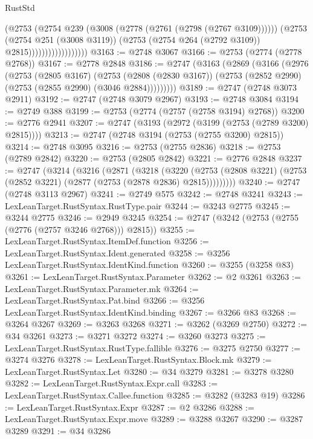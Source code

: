 \begin{lexlean}{RustStd}
\begin{coremodule}
{\begin{coremodule}
{{{{{{{{{{{{{{{{{{{{{{{{{{{{{{{{{                                  (@2753
                                    (@2754 @239 (@3008 (@2778 (@2761 (@2798 (@2767 @3109))))))
                                    (@2753
                                      (@2754 @251 (@3008 @3119))
                                      (@2753 (@2754 @264 (@2792 @3109)) @2815))))))))))))))))))
@3163 := @2748 @3067
@3166 := @2753 (@2774 (@2778 @2768))
@3167 := @2778 @2848
@3186 := @2747
    (@3163
      (@2869
        (@3166
          (@2976
            (@2753
              (@2805 @3167)
              (@2753
                (@2808 (@2830 @3167))
                (@2753 (@2852 @2990) (@2753 (@2855 @2990) (@3046 @2884)))))))))
@3189 := @2747 (@2748 @3073 @2911)
@3192 := @2747 (@2748 @3079 @2967)
@3193 := @2748 @3084
@3194 := @2749 @388
@3199 := @2753 (@2774 (@2757 (@2758 @3194) @2768))
@3200 := @2776 @2941
@3207 := @2747 (@3193 (@2972 (@3199 (@2753 (@2789 @3200) @2815))))
@3213 := @2747 (@2748 @3194 (@2753 (@2755 @3200) @2815))
@3214 := @2748 @3095
@3216 := @2753 (@2755 @2836)
@3218 := @2753 (@2789 @2842)
@3220 := @2753 (@2805 @2842)
@3221 := @2776 @2848
@3237 := @2747
    (@3214
      (@3216
        (@2871
          (@3218
            (@3220
              (@2753 (@2808 @3221) (@2753 (@2852 @3221) (@2877 (@2753 (@2878 @2836) @2815)))))))))
@3240 := @2747 (@2748 @3113 @2967)
@3241 := @2749 @575
@3242 := @2748 @3241
@3243 := LexLeanTarget.RustSyntax.RustType.pair
@3244 := @3243 @2775
@3245 := @3244 @2775
@3246 := @2949 @3245
@3254 := @2747 (@3242 (@2753 (@2755 (@2776 (@2757 @3246 @2768))) @2815))
@3255 := LexLeanTarget.RustSyntax.ItemDef.function
@3256 := LexLeanTarget.RustSyntax.Ident.generated
@3258 := @3256 LexLeanTarget.RustSyntax.IdentKind.function
@3260 := @3255 (@3258 @83)
@3261 := LexLeanTarget.RustSyntax.Parameter
@3262 := @2 @3261
@3263 := LexLeanTarget.RustSyntax.Parameter.mk
@3264 := LexLeanTarget.RustSyntax.Pat.bind
@3266 := @3256 LexLeanTarget.RustSyntax.IdentKind.binding
@3267 := @3266 @83
@3268 := @3264 @3267
@3269 := @3263 @3268
@3271 := @3262 (@3269 @2750)
@3272 := @34 @3261
@3273 := @3271 @3272
@3274 := @3260 @3273
@3275 := LexLeanTarget.RustSyntax.RustType.fallible
@3276 := @3275 @2750
@3277 := @3274 @3276
@3278 := LexLeanTarget.RustSyntax.Block.mk
@3279 := LexLeanTarget.RustSyntax.Let
@3280 := @34 @3279
@3281 := @3278 @3280
@3282 := LexLeanTarget.RustSyntax.Expr.call
@3283 := LexLeanTarget.RustSyntax.Callee.function
@3285 := @3282 (@3283 @19)
@3286 := LexLeanTarget.RustSyntax.Expr
@3287 := @2 @3286
@3288 := LexLeanTarget.RustSyntax.Expr.move
@3289 := @3288 @3267
@3290 := @3287 @3289
@3291 := @34 @3286
}}}}}}}}}}}}}}}}}}}}}}}}}}}}}}}}}
\end{coremodule}}
\end{coremodule}
\end{lexlean}
